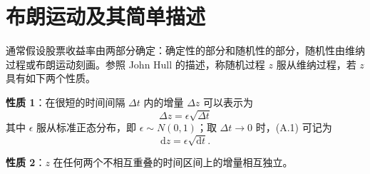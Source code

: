 
\chapter{布朗运动及其简单描述}

\begin{tcolorbox}[summary,title=附录提要]
通常假设股票收益率由两部分确定：确定性的部分和随机性的部分，随机性由维纳过程或布朗运动刻画。参照 John Hull 的描述，称随机过程 $z$ 服从维纳过程，若 $z$ 具有如下两个性质。

\textbf{性质 1}：在很短的时间间隔 $\Delta t$ 内的增量 $\Delta z$ 可以表示为
\[
    \Delta z=\epsilon\sqrt{\Delta t}
    \tag{A.1}
\]
其中 $\epsilon$ 服从标准正态分布，即 $\epsilon\sim N(0,1)$；取 $\Delta t\to 0$ 时，(A.1) 可记为
\[
    \mathrm{d}z=\epsilon\sqrt{\mathrm{d}t}.
    \tag{A.2}
\]

\textbf{性质 2}：$z$ 在任何两个不相互重叠的时间区间上的增量相互独立。%
\end{tcolorbox}
